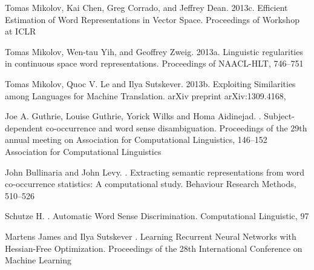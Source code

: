\documentclass[11pt]{article}
\begin{document}
\begin{thebibliography}{}
Tomas Mikolov, Kai Chen, Greg Corrado, and Jeffrey Dean.
\newblock 2013c.
\newblock Efficient Estimation of Word Representations in Vector Space.
\newblock Proceedings of Workshop at ICLR

Tomas Mikolov, Wen-tau Yih, and Geoffrey Zweig.
\newblock 2013a.
\newblock Linguistic regularities in continuous space word representations.
\newblock Proceedings of NAACL-HLT, 
746--751

Tomas Mikolov, Quoc V. Le and Ilya Sutskever.
\newblock 2013b.
\newblock Exploiting Similarities among Languages for Machine Translation.
\newblock arXiv preprint arXiv:1309.4168, 

Joe A. Guthrie, Louise Guthrie, Yorick Wilks and Homa Aidinejad.
.
\newblock Subject-dependent co-occurrence and word sense disambiguation.
\newblock Proceedings of the 29th annual meeting on Association for Computational Linguistics, 
146--152
\newblock
Association for Computational Linguistics

John Bullinaria and John Levy.
.
\newblock Extracting semantic representations from word co-occurrence statistics: A computational study.
\newblock Behaviour Research Methods, 
510--526

Schutze H.
.
\newblock Automatic Word Sense Discrimination.
\newblock Computational Linguistic, 
97

Martens James and Ilya Sutskever
.
\newblock Learning Recurrent Neural Networks with Hessian-Free Optimization.
\newblock Proceedings of the 28th International Conference on Machine Learning

\end{thebibliography}
\end{document}
